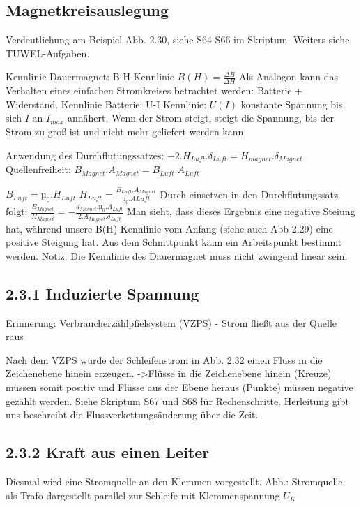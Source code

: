 \documentclass[a4paper]{article}
\begin{document}
\subsection*{Magnetkreisauslegung}
Verdeutlichung am Beispiel Abb. 2.30, siehe S64-S66 im Skriptum. Weiters siehe TUWEL-Aufgaben.

Kennlinie Dauermagnet:
B-H Kennlinie $B(H)=\frac{\Delta B}{\Delta H}$ 
Als Analogon kann das Verhalten eines einfachen Stromkreises betrachtet werden: Batterie + Widerstand.
Kennlinie Batterie:
U-I Kennlinie:
$U(I)$ konstante Spannung bis sich  $I$ an  $I_{max}$ annähert.
 Wenn der Strom steigt, steigt die Spannung, bis der Strom zu groß ist und nicht mehr geliefert werden kann.

 Anwendung des Durchflutungssatzes: $-2.H_{Luft}.\delta_{Luft}=H_{magnet}.\delta_{Magnet}$
 Quellenfreiheit: $B_{Magnet}.A_{Magnet}=B_{Luft}.A_{Luft}$

 $B_{Luft}=µ_0.H_{Luft}$
 $H_{Luft}=\frac{B_{Luft}.A_{Magnet}}{µ_0.A{Luft}}$ 
 Durch einsetzen in den Durchflutungssatz folgt:
 $\frac{B_{Magnet}}{H_{Magnet}}=-\frac{d_{Magnet}.µ_0.A_{Luft}}{2.A_{Magnet}.\delta_{Luft}}$
  Man sieht, dass dieses Ergebnis eine negative Steiung hat, während unsere B(H) Kennlinie vom Anfang (siehe auch Abb 2.29) eine positive Steigung hat. Aus dem Schnittpunkt kann ein Arbeitspunkt bestimmt werden.
Notiz: Die Kennlinie des Dauermagnet muss nicht zwingend linear sein.

\subsection*{2.3.1 Induzierte Spannung}
Erinnerung: Verbraucherzählpfielsystem (VZPS) - Strom fließt aus der Quelle raus

Nach dem VZPS würde der Schleifenstrom in Abb. 2.32 einen Fluss in die Zeichenebene hinein erzeugen.
    ->Flüsse in die Zeichenebene hinein (Kreuze) müssen somit positiv und Flüsse aus der Ebene heraus (Punkte) müssen negative gezählt werden.
Siehe Skriptum S67 und S68 für Rechenschritte. Herleitung gibt uns beschreibt die Flussverkettungsänderung über die Zeit.

\subsection*{2.3.2 Kraft aus einen Leiter}
Diesmal wird eine Stromquelle an den Klemmen vorgestellt.
Abb.: Stromquelle als Trafo dargestellt parallel zur Schleife mit Klemmenspannung $U_K$
\end{document}
